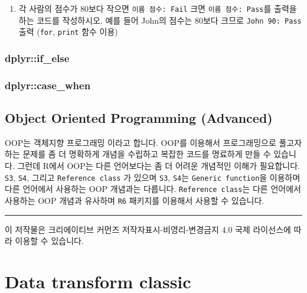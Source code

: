 \documentclass[
  a4paper,
]{book}
\providecommand{\tightlist}{%
  \setlength{\itemsep}{0pt}\setlength{\parskip}{0pt}}\usepackage{longtable,booktabs,array}
\begin{document}
\begin{enumerate}
\def\labelenumi{\arabic{enumi})}
\setcounter{enumi}{1}
\tightlist
\item
  각 사람의 점수가 80보다 작으면 \texttt{이름\ 점수:\ Fail} 크면
  \texttt{이름\ 점수:\ Pass}를 출력을 하는 코드를 작성하시오. 예를 들어
  John의 점수는 80보다 크므로 \texttt{John\ 90:\ Pass} 출력
  (\texttt{for}, \texttt{print} 함수 이용)
\end{enumerate}

\hypertarget{dplyrif_else}{%
\subsection{dplyr::if\_else}\label{dplyrif_else}}

\hypertarget{dplyrcase_when}{%
\subsection{dplyr::case\_when}\label{dplyrcase_when}}

\hypertarget{object-oriented-programming-advanced}{%
\section{Object Oriented Programming
(Advanced)}\label{object-oriented-programming-advanced}}

OOP는 객체지향 프로그래밍 이라고 합니다. OOP를 이용해서 프로그래밍으로
풀고자 하는 문제를 좀 더 명확하게 개념을 수립하고 복잡한 코드를 명료하게
만들 수 있습니다. 그런데 R에서 OOP는 다른 언어보다는 좀 더 어려운
개념적인 이해가 필요합니다. \texttt{S3}, \texttt{S4}, 그리고
\texttt{Reference\ class} 가 있으며 \texttt{S3}, \texttt{S4}는
\texttt{Generic\ function}을 이용하며 다른 언어에서 사용하는 OOP
개념과는 다릅니다. \texttt{Reference\ class}는 다른 언어에서 사용하는
OOP 개념과 유사하며 \texttt{R6} 패키지를 이용해서 사용할 수 있습니다.

\begin{center}\rule{0.5\linewidth}{0.5pt}\end{center}

이 저작물은 크리에이티브 커먼즈 저작자표시-비영리-변경금지 4.0 국제
라이선스에 따라 이용할 수 있습니다.


\hypertarget{data-transform-classic}{%
\chapter{Data transform classic}\label{data-transform-classic}}
\end{document}
